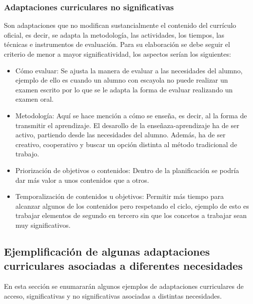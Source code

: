 \subsubsection{Adaptaciones curriculares no significativas}
Son adaptaciones que no modifican sustancialmente el contenido del currículo oficial, es decir, se adapta la metodología, las actividades, los tiempos, las técnicas e instrumentos de evaluación. Para su elaboración se debe  seguir el criterio de menor a mayor significatividad, los aspectos serían los siguientes:
\begin{itemize}
    \item Cómo evaluar: Se ajusta la manera de evaluar a las necesidades del alumno, ejemplo de ello es cuando un alumno con escayola no puede realizar un examen escrito por lo que se le adapta la forma de evaluar realizando un examen oral.
    \item Metodología: Aquí se hace mención a cómo se enseña, es decir, al la forma de transmitir el aprendizaje. El desarollo de la enseñaza-aprendizaje ha de ser activo, partiendo desde las necesidades del alumno. Además, ha de ser creativo, cooperativo y buscar un opción distinta al método tradicional de trabajo.
    \item Priorización de objetivos o contenidos: Dentro de la planificación se podría dar más valor a unos contenidos que a otros.
    \item Temporalización de contenidos u objetivos: Permitir más tiempo para alcanzar algunos de los contenidos pero respetando el ciclo, ejemplo de esto es trabajar elementos de segundo en tercero sin que los concetos a trabajar sean muy significativos.
\end{itemize}

\subsection{Ejemplificación de algunas adaptaciones curriculares asociadas a diferentes necesidades }

En esta sección se enumararán algunos ejemplos de adaptaciones curriculares de acceso, significativas y no significativas asociadas a distintas necesidades.

